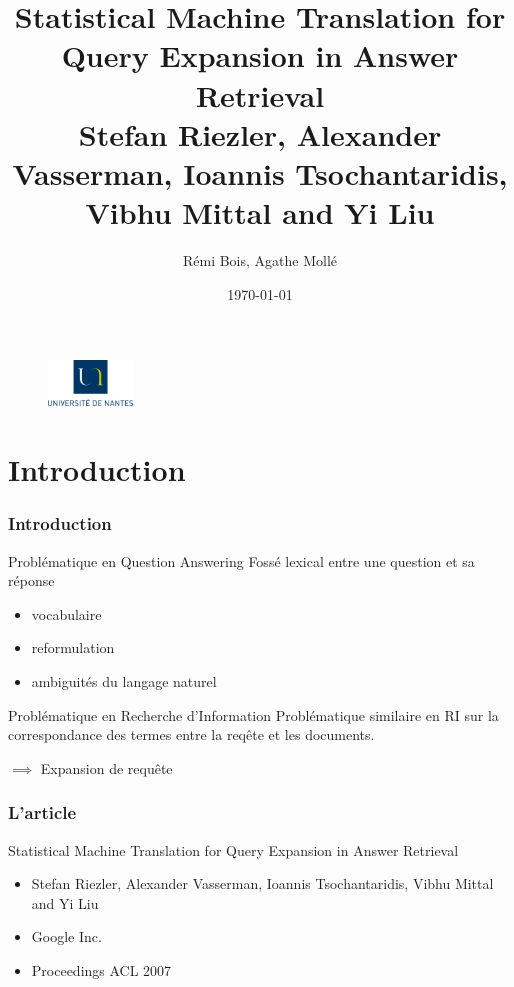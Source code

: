\documentclass[10pt]{beamer}
\title{Statistical Machine Translation for Query Expansion in Answer
  Retrieval\cite{Riezler07}\\ 
\small
Stefan Riezler, Alexander Vasserman, Ioannis Tsochantaridis, Vibhu
Mittal and Yi Liu}
\author{Rémi Bois, Agathe Mollé}
\date{\today}
\begin{document}
\begin{frame}
  \maketitle
  \vfill
  \begin{figure}
    \includegraphics[width=0.20\textwidth]{logo_univ_nantes}
  \end{figure}

\end{frame}

\begin{frame}
  \tableofcontents
\end{frame}

\section{Introduction}
\label{sec:intro}

\begin{frame}
  \frametitle{Introduction}
  \begin{block}{Problématique en Question Answering}
  Fossé lexical entre une question et sa réponse
  \begin{itemize}
    \item vocabulaire
    \item reformulation
    \item ambiguités du langage naturel
  \end{itemize}
  \end{block}
  
  \pause
  
  \begin{block}{Problématique en Recherche d'Information}
  Problématique similaire en RI sur la correspondance des termes entre la req\^ete et les documents.
  
  $\implies$ Expansion de requ\^ete
  \end{block}
\end{frame}

\begin{frame}
  \frametitle{L'article}  
  \begin{block}{Statistical Machine Translation for Query Expansion in Answer Retrieval}
  \begin{itemize}
    \item Stefan Riezler, Alexander Vasserman, Ioannis Tsochantaridis, Vibhu Mittal and Yi Liu
    \item Google Inc.
    \item Proceedings ACL 2007
  \end{itemize}
  \end{block}
\end{frame}
\end{document}
